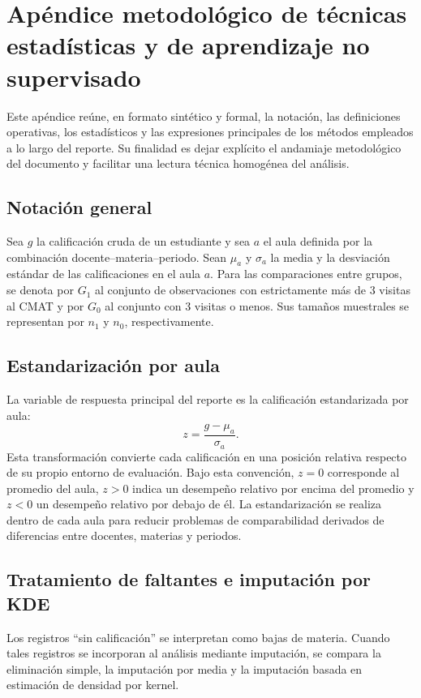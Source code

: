 \documentclass[8pt,a4paper]{article} %
\numberwithin{figure}{subsection}
\begin{document}
\appendix
\newpage
\section{Apéndice metodológico de técnicas estadísticas y de aprendizaje no supervisado}

Este apéndice reúne, en formato sintético y formal, la notación, las definiciones operativas, los estadísticos y las expresiones principales de los métodos empleados a lo largo del reporte. Su finalidad es dejar explícito el andamiaje metodológico del documento y facilitar una lectura técnica homogénea del análisis.

\subsection{Notación general}
Sea $g$ la calificación cruda de un estudiante y sea $a$ el aula definida por la combinación docente--materia--periodo. Sean $\mu_a$ y $\sigma_a$ la media y la desviación estándar de las calificaciones en el aula $a$. Para las comparaciones entre grupos, se denota por $G_1$ al conjunto de observaciones con estrictamente más de 3 visitas al CMAT y por $G_0$ al conjunto con 3 visitas o menos. Sus tamaños muestrales se representan por $n_1$ y $n_0$, respectivamente.

\subsection{Estandarización por aula}
La variable de respuesta principal del reporte es la calificación estandarizada por aula:
\[
z=\frac{g-\mu_a}{\sigma_a}.
\]
Esta transformación convierte cada calificación en una posición relativa respecto de su propio entorno de evaluación. Bajo esta convención, $z=0$ corresponde al promedio del aula, $z>0$ indica un desempeño relativo por encima del promedio y $z<0$ un desempeño relativo por debajo de él. La estandarización se realiza dentro de cada aula para reducir problemas de comparabilidad derivados de diferencias entre docentes, materias y periodos.

\subsection{Tratamiento de faltantes e imputación por KDE}
Los registros ``sin calificación'' se interpretan como bajas de materia. Cuando tales registros se incorporan al análisis mediante imputación, se compara la eliminación simple, la imputación por media y la imputación basada en estimación de densidad por kernel.
\end{document}
